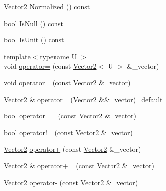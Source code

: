 \begin{DoxyCompactItemize}
\item 
\mbox{\hyperlink{structpad_1_1math_1_1_vector2}{Vector2}} \mbox{\hyperlink{structpad_1_1math_1_1_vector2_ad940f1a2e4e6c58f742e85327493750a}{Normalized}} () const
\item 
bool \mbox{\hyperlink{structpad_1_1math_1_1_vector2_a5aeeb38488eb3d220506c64d557e94ae}{Is\+Null}} () const
\item 
bool \mbox{\hyperlink{structpad_1_1math_1_1_vector2_ac89422aa3df0d31115df268982e9bb0e}{Is\+Unit}} () const
\item 
{\footnotesize template$<$typename U $>$ }\\void \mbox{\hyperlink{structpad_1_1math_1_1_vector2_a15cc5eb00ac19e79734bc01e98da4595}{operator=}} (const \mbox{\hyperlink{structpad_1_1math_1_1_vector2}{Vector2}}$<$ U $>$ \&\+\_\+vector)
\item 
void \mbox{\hyperlink{structpad_1_1math_1_1_vector2_aa51f745cce489dd9eac9291a1a9bc5c2}{operator=}} (const \mbox{\hyperlink{structpad_1_1math_1_1_vector2}{Vector2}} \&\+\_\+vector)
\item 
\mbox{\hyperlink{structpad_1_1math_1_1_vector2}{Vector2}} \& \mbox{\hyperlink{structpad_1_1math_1_1_vector2_a33461284df3fb3b552f58aa3546da484}{operator=}} (\mbox{\hyperlink{structpad_1_1math_1_1_vector2}{Vector2}} \&\&\+\_\+vector)=default
\item 
bool \mbox{\hyperlink{structpad_1_1math_1_1_vector2_a972117e74465bc6e610d646943922975}{operator==}} (const \mbox{\hyperlink{structpad_1_1math_1_1_vector2}{Vector2}} \&\+\_\+vector)
\item 
bool \mbox{\hyperlink{structpad_1_1math_1_1_vector2_a3fc28d0cce711c660bf2b462aeaf41f2}{operator!=}} (const \mbox{\hyperlink{structpad_1_1math_1_1_vector2}{Vector2}} \&\+\_\+vector)
\item 
\mbox{\hyperlink{structpad_1_1math_1_1_vector2}{Vector2}} \mbox{\hyperlink{structpad_1_1math_1_1_vector2_af15cdb7c3cc3862a45ea35b5d6f934be}{operator+}} (const \mbox{\hyperlink{structpad_1_1math_1_1_vector2}{Vector2}} \&\+\_\+vector)
\item 
\mbox{\hyperlink{structpad_1_1math_1_1_vector2}{Vector2}} \& \mbox{\hyperlink{structpad_1_1math_1_1_vector2_a5c5fa87e2a0f8b5d2e3223220dea22a4}{operator+=}} (const \mbox{\hyperlink{structpad_1_1math_1_1_vector2}{Vector2}} \&\+\_\+vector)
\item 
\mbox{\hyperlink{structpad_1_1math_1_1_vector2}{Vector2}} \mbox{\hyperlink{structpad_1_1math_1_1_vector2_a0d028e47bd7f8b2c26fc52c49bc2f973}{operator-\/}} (const \mbox{\hyperlink{structpad_1_1math_1_1_vector2}{Vector2}} \&\+\_\+vector)

\end{DoxyCompactItemize}
